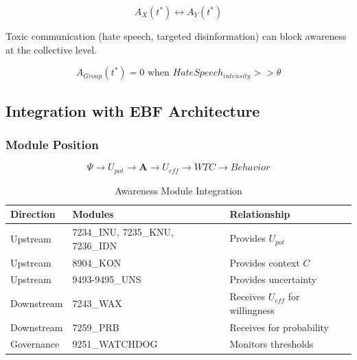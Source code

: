 \begin{equation}
A_X(t^*) \leftrightarrow A_Y(t^*)
\end{equation}

\begin{axiom}
\label{ax:awx-a80}
Toxic communication (hate speech, targeted disinformation) can block 
awareness at the collective level.
\end{axiom}

\begin{equation}
A_{Group}(t^*) = 0 \text{ when } HateSpeech_{intensity} >> \theta
\end{equation}

\subsection{Integration with EBF Architecture}
\label{subsec:awareness-integration}

\subsubsection{Module Position}

\begin{equation}
\Psi \rightarrow U_{pot} \rightarrow \mathbf{A} \rightarrow U_{eff} \rightarrow WTC \rightarrow Behavior
\end{equation}

\begin{table}[htbp]
\centering
\caption{Awareness Module Integration}
\label{tab:module-integration}
\renewcommand{\arraystretch}{1.3}
\begin{tabular}{@{}lll@{}}
\toprule
\textbf{Direction} & \textbf{Modules} & \textbf{Relationship} \\
\midrule
Upstream & 7234\_INU, 7235\_KNU, 7236\_IDN & Provides $U_{pot}$ \\
Upstream & 8904\_KON & Provides context $C$ \\
Upstream & 9493-9495\_UNS & Provides uncertainty \\
Downstream & 7243\_WAX & Receives $U_{eff}$ for willingness \\
Downstream & 7259\_PRB & Receives for probability \\
Governance & 9251\_WATCHDOG & Monitors thresholds \\
\bottomrule
\end{tabular}
\end{table}

